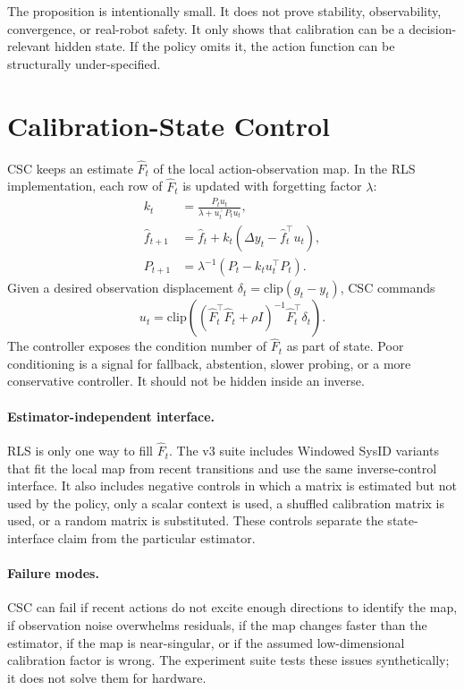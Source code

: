 \documentclass{article}
\newcommand{\obs}{y}
\newcommand{\goal}{g}
\newcommand{\act}{u}
\newcommand{\cmaphat}{\hat F}
\newcommand{\cov}{P}
\begin{document}
The proposition is intentionally small. It does not prove stability,
observability, convergence, or real-robot safety. It only shows that
calibration can be a decision-relevant hidden state. If the policy omits it,
the action function can be structurally under-specified.

\section{Calibration-State Control}

CSC keeps an estimate $\cmaphat_t$ of the local action-observation map. In the
RLS implementation, each row of $\cmaphat_t$ is updated with forgetting factor
$\lambda$:
\begin{align}
  k_t &= \frac{\cov_t \act_t}{\lambda+\act_t^\top\cov_t\act_t},\\
  \hat f_{t+1} &= \hat f_t + k_t(\Delta \obs_t-\hat f_t^\top \act_t),\\
  \cov_{t+1} &= \lambda^{-1}(\cov_t-k_t\act_t^\top\cov_t).
\end{align}
Given a desired observation displacement
$\delta_t=\mathrm{clip}(\goal_t-\obs_t)$, CSC commands
\begin{equation}
  \act_t =
  \mathrm{clip}\left((\cmaphat_t^\top\cmaphat_t+\rho I)^{-1}
  \cmaphat_t^\top \delta_t\right).
\end{equation}
The controller exposes the condition number of $\cmaphat_t$ as part of state.
Poor conditioning is a signal for fallback, abstention, slower probing, or a
more conservative controller. It should not be hidden inside an inverse.

\paragraph{Estimator-independent interface.}
RLS is only one way to fill $\cmaphat_t$. The v3 suite includes Windowed SysID
variants that fit the local map from recent transitions and use the same
inverse-control interface. It also includes negative controls in which a matrix
is estimated but not used by the policy, only a scalar context is used, a
shuffled calibration matrix is used, or a random matrix is substituted. These
controls separate the state-interface claim from the particular estimator.

\paragraph{Failure modes.}
CSC can fail if recent actions do not excite enough directions to identify the
map, if observation noise overwhelms residuals, if the map changes faster than
the estimator, if the map is near-singular, or if the assumed low-dimensional
calibration factor is wrong. The experiment suite tests these issues
synthetically; it does not solve them for hardware.
\end{document}
